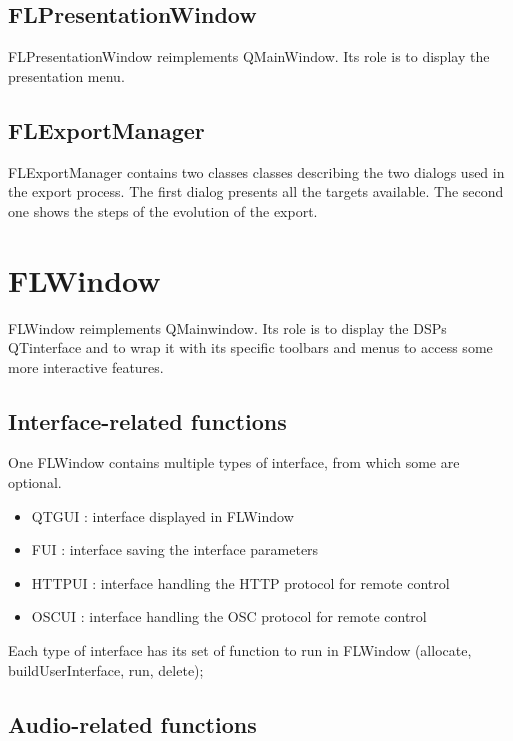 \documentclass[a4paper]{article}
\begin{document}
\subsection{FLPresentationWindow}

FLPresentationWindow reimplements QMainWindow. Its role is to display the presentation menu.

\subsection{FLExportManager}

FLExportManager contains two classes classes describing the two dialogs used in the export process. The first dialog presents all the targets available. The second one shows the steps of the evolution of the export.

\section{FLWindow}

FLWindow reimplements QMainwindow. Its role is to display the DSPs QTinterface and to wrap it with its specific toolbars and menus to access some more interactive features. 

\subsection{Interface-related functions}

One FLWindow contains multiple types of interface, from which some are optional. 

\begin{itemize}
\item QTGUI : interface displayed in FLWindow
\item FUI : interface saving the interface parameters
\item HTTPUI : interface handling the HTTP protocol for remote control
\item OSCUI : interface handling the OSC protocol for remote control 
\end{itemize}

Each type of interface has its set of function to run in FLWindow (allocate, buildUserInterface, run, delete);

\subsection{Audio-related functions}
\end{document}
